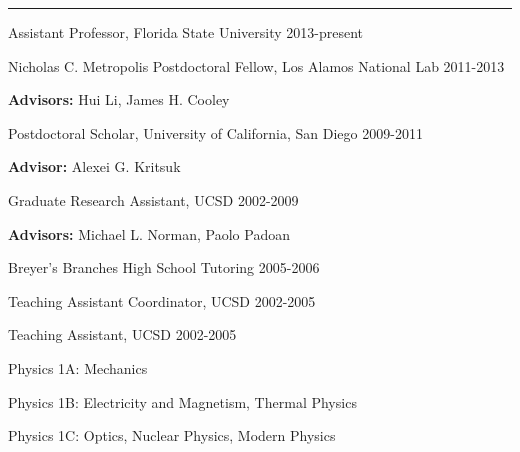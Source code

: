 
\rule[3pt]{384pt}{.1mm}

\medskip
\noindent
Assistant Professor, Florida State University
\hfill
2013-present

\medskip
\noindent
Nicholas C. Metropolis Postdoctoral Fellow, Los Alamos National Lab
\hfill
2011-2013

{\bf Advisors: } Hui Li, James H. Cooley


\medskip
\noindent
Postdoctoral Scholar, University of California, San Diego
\hfill
2009-2011

{\bf Advisor: } Alexei G. Kritsuk

\medskip
\noindent
Graduate Research Assistant, UCSD
\hfill
2002-2009

{\bf Advisors: }Michael L. Norman, Paolo Padoan 

\medskip
\noindent
Breyer's Branches High School Tutoring
\hfill 2005-2006

\medskip
\noindent
Teaching Assistant Coordinator, UCSD
\hfill 2002-2005

\medskip
\noindent
Teaching Assistant, UCSD
\hfill 2002-2005

Physics 1A: Mechanics

Physics 1B: Electricity and Magnetism, Thermal Physics

Physics 1C: Optics, Nuclear Physics, Modern Physics


